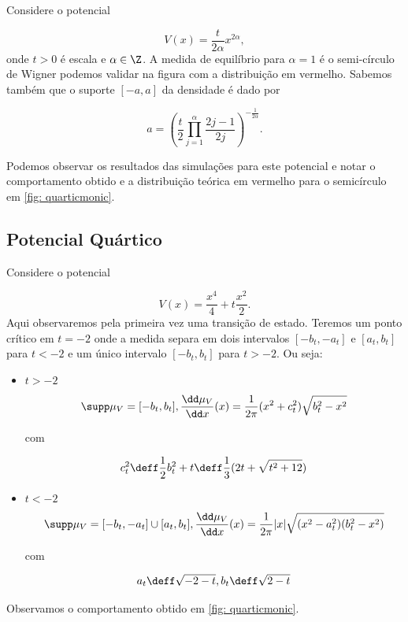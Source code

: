 Considere o potencial

\[
	V(x) = \frac{t}{2\alpha} x^{2\alpha},
\]
onde $t > 0$ é escala e $\alpha \in \Z$. A medida de equilíbrio para $\alpha = 1$ é o semi-círculo de Wigner podemos validar na figura com a distribuição em vermelho. Sabemos também que o suporte $[-a, a]$ da densidade é dado por

\[
	a = \left( \frac{t}{2} \prod_{j=1}^{\alpha} \frac{2j-1}{2j} \right)^{-\frac{1}{2\alpha}}.
\]

 Podemos observar os resultados das simulações para este potencial e notar o comportamento obtido e a distribuição teórica em vermelho para o semicírculo em \ref{fig: quarticmonic}.


\subsection{Potencial Quártico}

Considere o potencial

\[
	V(x) = \frac{x^4}{4} + t \frac{x^2}{2}.
\]
Aqui observaremos pela primeira vez uma transição de estado. Teremos um ponto crítico em $t=-2$ onde a medida separa em dois intervalos $[-b_t, -a_t]$ e $[a_t, b_t]$ para $t < -2$ e um único intervalo $[-b_t, b_t]$ para $t > -2$. Ou seja:

\begin{itemize}
	\item \(t > -2\)
	\[
	\supp \mu_V = [-b_t, b_t], \frac{\dd \mu_V}{\dd x}(x) = \frac{1}{2\pi} (x^2 + c_t^2) \sqrt{b_t^2 - x^2} 
	\]
	
	com
	
	\[
		c_t^2 \deff\frac{1}{2} b_t^2 + t \deff \frac{1}{3} (2t + \sqrt{t^2 + 12})
	\]
	
	\item \(t < -2\)
	\[
	\supp \mu_V = [-b_t, -a_t] \cup [a_t, b_t], \frac{\dd \mu_V}{\dd x}(x) = \frac{1}{2\pi} |x| \sqrt{(x^2 - a_t^2)(b_t^2 - x^2)} 
	\]
	
	com
	
	\[
	a_t \deff \sqrt{-2-t}, b_t \deff \sqrt{2-t}
	\]
\end{itemize}

Observamos o comportamento obtido em \ref{fig: quarticmonic}. 

